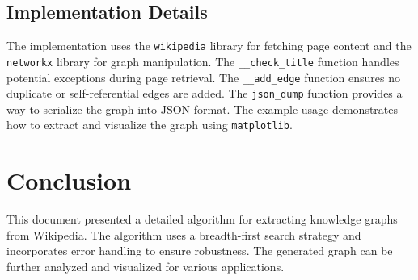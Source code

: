 \documentclass{article}
\begin{document}
	\subsection{Implementation Details}
	
	The implementation uses the \texttt{wikipedia} library for fetching page content and the \texttt{networkx} library for graph manipulation.  The \texttt{\_\_check\_title} function handles potential exceptions during page retrieval. The \texttt{\_\_add\_edge} function ensures no duplicate or self-referential edges are added.  The \texttt{json\_dump} function provides a way to serialize the graph into JSON format. The example usage demonstrates how to extract and visualize the graph using \texttt{matplotlib}.
	
	\section{Conclusion}
	
	This document presented a detailed algorithm for extracting knowledge graphs from Wikipedia. The algorithm uses a breadth-first search strategy and incorporates error handling to ensure robustness. The generated graph can be further analyzed and visualized for various applications.
	
\end{document}
